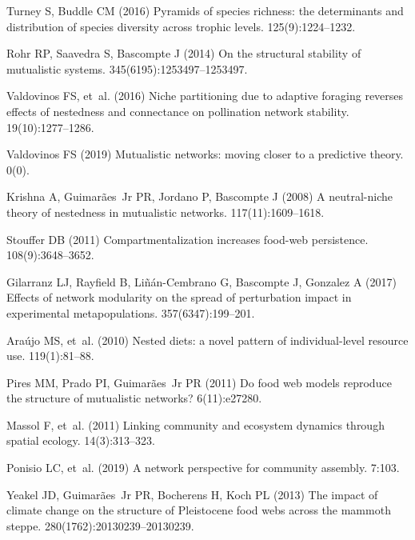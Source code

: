 \documentclass[twocolumn,preprintnumbers,amsmath,amssymb,superscriptaddress]{revtex4}
\begin{document}
\begin{thebibliography}{10}
Turney S, Buddle CM (2016) Pyramids of species richness: the determinants and
  distribution of species diversity across trophic levels.
 125(9):1224--1232.

Rohr RP, Saavedra S, Bascompte J (2014) {On the structural stability of
  mutualistic systems}.
 345(6195):1253497--1253497.

Valdovinos FS, et~al. (2016) {Niche partitioning due to adaptive foraging
  reverses effects of nestedness and connectance on pollination network
  stability}.
 19(10):1277--1286.

Valdovinos FS (2019) Mutualistic networks: moving closer to a predictive
  theory.
 0(0).

Krishna A, Guimar{\~a}es~Jr PR, Jordano P, Bascompte J (2008) {A neutral-niche
  theory of nestedness in mutualistic networks}.
 117(11):1609--1618.

Stouffer DB (2011) {Compartmentalization increases food-web persistence}.
 108(9):3648--3652.

Gilarranz LJ, Rayfield B, Li{\~n}{\'a}n-Cembrano G, Bascompte J, Gonzalez A
  (2017) {Effects of network modularity on the spread of perturbation impact in
  experimental metapopulations}.
 357(6347):199--201.

Ara\'{u}jo MS, et~al. (2010) Nested diets: a novel pattern of individual-level
  resource use.
 119(1):81--88.

Pires MM, Prado PI, Guimar{\~a}es~Jr PR (2011) Do food web models reproduce the
  structure of mutualistic networks?
 6(11):e27280.

Massol F, et~al. (2011) {Linking community and ecosystem dynamics through
  spatial ecology}.
 14(3):313--323.

Ponisio LC, et~al. (2019) A network perspective for community assembly.
 7:103.

Yeakel JD, Guimar{\~a}es~Jr PR, Bocherens H, Koch PL (2013) {The impact of
  climate change on the structure of Pleistocene food webs across the mammoth
  steppe}.
 280(1762):20130239--20130239.


\end{thebibliography}
\end{document}
